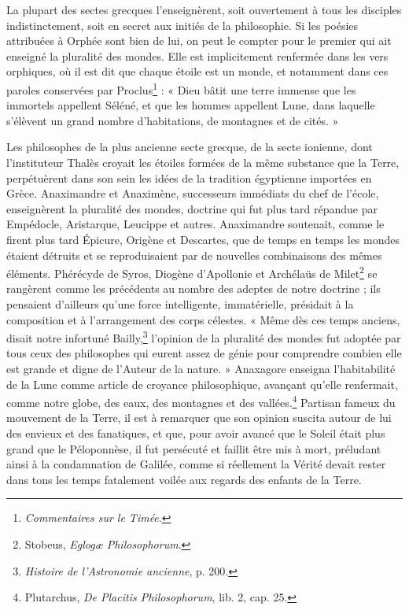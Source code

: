 \documentclass[a4paper, 11pt, oneside]{article}
\begin{document}
La plupart des sectes grecques l'enseignèrent, soit ouvertement à tous les disciples indistinctement, soit en secret aux initiés de la philosophie. Si les poésies attribuées à Orphée sont bien de lui, on peut le compter pour le premier qui ait enseigné la pluralité des mondes. Elle est implicitement renfermée dans les vers orphiques, où il est dit que chaque étoile est un monde, et notamment dans ces paroles conservées par Proclus\footnote{\emph{Commentaires sur le Timée}.} : « Dieu bâtit une terre immense que les immortels appellent Séléné, et que les hommes appellent Lune, dans laquelle s'élèvent un grand nombre d'habitations, de montagnes et de cités. »

Les philosophes de la plus ancienne secte grecque, de la secte ionienne, dont l'instituteur Thalès croyait les étoiles formées de la même substance que la Terre, perpétuèrent dans son sein les idées de la tradition égyptienne importées en Grèce. Anaximandre et Anaximène, successeurs immédiats du chef de l'école, enseignèrent la pluralité des mondes, doctrine qui fut plus tard répandue par Empédocle, Aristarque, Leucippe et autres. Anaximandre soutenait, comme le firent plus tard Épicure, Origène et Descartes, que de temps en temps les mondes étaient détruits et se reproduisaient par de nouvelles combinaisons des mêmes éléments. Phérécyde de Syros, Diogène d'Apollonie et Archélaüs de Milet\footnote{Stobeus, \emph{Eglogæ Philosophorum}.} se rangèrent comme les précédents au nombre des adeptes de notre doctrine ; ils pensaient d'ailleurs qu'une force intelligente, immatérielle, présidait à la composition et à l'arrangement des corps célestes. « Même dès ces temps anciens, disait notre infortuné Bailly,\footnote{\emph{Histoire de l'Astronomie ancienne}, p. 200.} l'opinion de la pluralité des mondes fut adoptée par tous ceux des philosophes qui eurent assez de génie pour comprendre combien elle est grande et digne de l'Auteur de la nature. » Anaxagore enseigna l'habitabilité de la Lune comme article de croyance philosophique, avançant qu'elle renfermait, comme notre globe, des eaux, des montagnes et des vallées.\footnote{Plutarchus, \emph{De Placitis Philosophorum}, lib. 2, cap. 25.} Partisan fameux du mouvement de la Terre, il est à remarquer que son opinion suscita autour de lui des envieux et des fanatiques, et que, pour avoir avancé que le Soleil était plus grand que le Péloponnèse, il fut persécuté et faillit être mis à mort, préludant ainsi à la condamnation de Galilée, comme si réellement la Vérité devait rester dans tons les temps fatalement voilée aux regards des enfants de la Terre.
\end{document}
